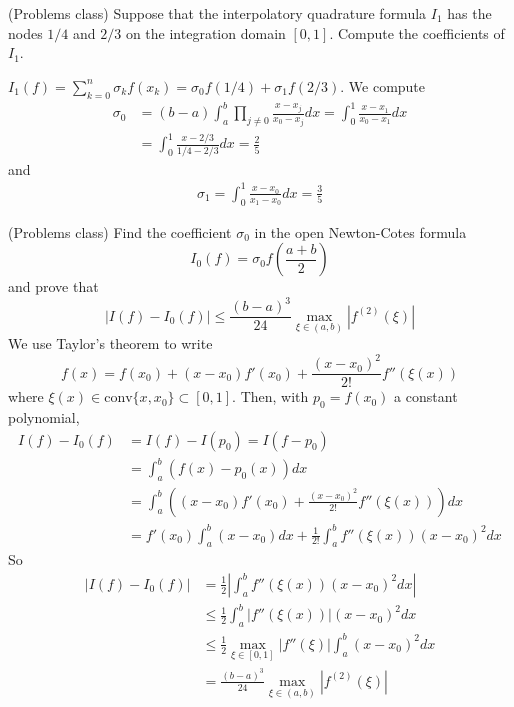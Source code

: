 \begin{example}
	(Problems class) Suppose that the interpolatory quadrature formula $I_1$ has the nodes $1/4$ and $2/3$ on the integration domain $[0, 1]$. Compute the coefficients of $I_1$.
	
	$I_1(f) = \sum_{k = 0}^{n} \sigma_k f(x_k) = \sigma_0 f(1/4) + \sigma_1 f(2/3)$. We compute
	\[
		\begin{aligned}
			\sigma_0 & = (b - a) \int_{a}^{b} \prod_{j \ne 0} \frac{x - x_j}{x_0 - x_j} dx = \int_{0}^{1} \frac{x - x_1}{x_0 - x_1} dx \\
			& = \int_{0}^{1} \frac{x - 2/3}{1/4 - 2/3} dx = \frac{2}{5}
		\end{aligned}
	\]
	and
	\[
		\begin{aligned}
			\sigma_1 = \int_{0}^{1} \frac{x - x_0}{x_1 - x_0} dx = \frac{3}{5}
		\end{aligned}
	\]
\end{example}

\begin{example}
	(Problems class) Find the coefficient $\sigma_0$ in the open Newton-Cotes formula
	\[
		I_0(f) = \sigma_0 f \left( \frac{a + b}{2} \right)
	\]
	and prove that
	\[
		|I(f) - I_0(f)| \le \frac{(b - a)^3}{24} \max_{\xi \in (a, b)} |f^{(2)}(\xi)|
	\]
	We use Taylor's theorem to write
	\[
		f(x) = f(x_0) + (x - x_0) f'(x_0) + \frac{{(x - x_0)}^2}{2!} f''(\xi(x))
	\]
	where $\xi(x) \in \text{conv} \{ x, x_0 \} \subset [0, 1]$. Then, with $p_0 = f(x_0)$ a constant polynomial,
	\[
		\begin{aligned}
			I(f) - I_0(f) & = I(f) - I(p_0) = I(f - p_0) \\
			& = \int_{a}^{b} (f(x) - p_0(x)) dx \\
			& = \int_{a}^{b} ((x - x_0) f'(x_0) + \frac{{(x - x_0)}^2}{2!} f''(\xi(x))) dx \\
			& = f'(x_0) \int_{a}^{b} (x - x_0) dx + \frac{1}{2!} \int_{a}^{b} f''(\xi(x)) (x - x_0)^2 dx
		\end{aligned}
	\]
	So
	\[
		\begin{aligned}
			|I(f) - I_0(f)| & = \frac{1}{2} \left| \int_{a}^{b} f''(\xi(x)) (x - x_0)^2 dx \right| \\
			& \le \frac{1}{2} \int_{a}^{b} |f''(\xi(x))| (x - x_0)^2 dx \\
			& \le \frac{1}{2} \max_{\xi \in [0, 1]} |f''(\xi)| \int_{a}^{b} (x - x_0)^2 dx \\
			& = \frac{(b - a)^3}{24} \max_{\xi \in (a, b)} |f^{(2)}(\xi)|
		\end{aligned}
	\]
\end{example}

